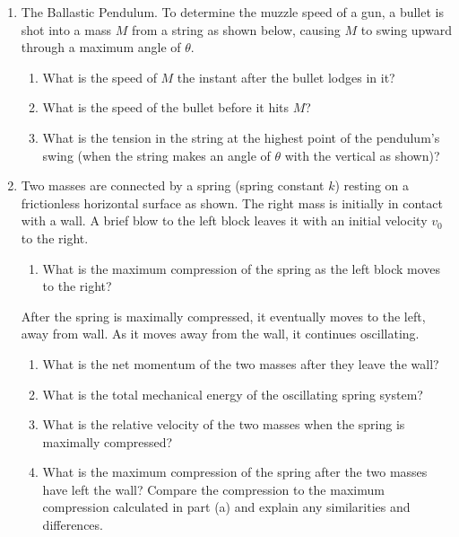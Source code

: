 \documentclass{../../oss-apphys}
\begin{document}
\begin{enumerate}[leftmargin=15pt]
\item The Ballastic Pendulum. To determine the muzzle speed of a gun, a bullet
  is shot into a mass $M$ from a string as shown below, causing $M$ to swing
  upward through a maximum angle of $\theta$.
  \begin{center}
  \end{center}
  \begin{enumerate}[noitemsep]
  \item What is the speed of $M$ the instant after the bullet lodges in it?
    \vspace{1.25in}
  \item What is the speed of the bullet before it hits $M$?
    \vspace{1.25in}
  \item What is the tension in the string at the highest point of the pendulum's
    swing (when the string makes an angle of $\theta$ with the vertical as
    shown)?
  \end{enumerate}
  \newpage
\item Two masses are connected by a spring (spring constant $k$) resting on a
  frictionless horizontal surface as shown. The right mass is initially in
  contact with a wall. A brief blow to the left block leaves it with an initial
  velocity $v_0$ to the right.
  \begin{enumerate}[leftmargin=18pt]
  \item What is the maximum compression of the spring as the left block moves
    to the right?
    \vspace{1in}
  \end{enumerate}
  After the spring is maximally compressed, it eventually moves to the left,
  away from wall. As it moves away from the wall, it continues oscillating.
  \begin{center}
  \end{center}
  \begin{enumerate}[leftmargin=18pt,resume]
  \item What is the net momentum of the two masses after they leave the wall?
    \vspace{1in}
  \item What is the total mechanical energy of the oscillating spring system?
    \vspace{1in}
  \item What is the relative velocity of the two masses when the spring is
    maximally compressed?
    \vspace{1in}
  \item What is the maximum compression of the spring after the two masses have
    left the wall? Compare the compression to the maximum compression calculated
    in part (a) and explain any similarities and differences.
  \end{enumerate}
\end{enumerate}
\end{document}
